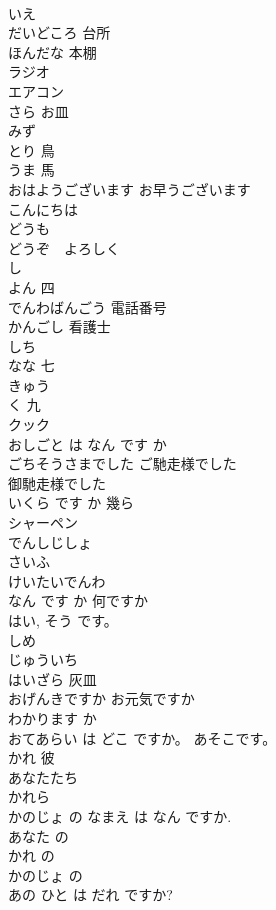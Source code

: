 \documentclass[8pt]{extreport}
\begin{document}
\begin{CJK}{UTF8}{min}
\\	いえ	
\\	だいどころ	台所
\\	ほんだな	本棚
\\	ラジオ	
\\	エアコン	
\\	さら	お皿
\\	みず	
\\	とり	鳥
\\	うま	馬
\\	おはようございます	お早うございます
\\	こんにちは	
\\	どうも	
\\	どうぞ　よろしく	
\\	し 
\\	よん	四
\\	でんわばんごう	電話番号
\\	かんごし	看護士
\\	しち 
\\	なな	七
\\	きゅう 
\\	く	九
\\	クック	
\\	おしごと は なん です か	
\\	ごちそうさまでした	ご馳走様でした 
\\	御馳走様でした
\\	いくら です か	幾ら
\\	シャーペン	
\\	でんしじしょ	
\\	さいふ	
\\	けいたいでんわ	
\\	なん です か	何ですか
\\	はい, そう です。	
\\	しめ	
\\	じゅういち	
\\	はいざら	灰皿
\\	おげんきですか	お元気ですか
\\	わかります か	
\\	おてあらい は どこ ですか。 あそこです。	
\\	かれ	彼
\\	あなたたち	
\\	かれら	
\\	かのじょ の なまえ は なん ですか.	
\\	あなた の	
\\	かれ の	
\\	かのじょ の	
\\	あの ひと は だれ ですか?	

\end{CJK}
\end{document}
